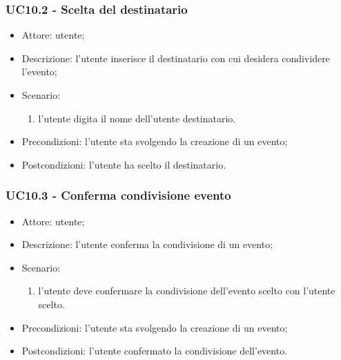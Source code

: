 \subsubsection{UC10.2 - Scelta del destinatario} \label{sec: UC10.2}
\begin{itemize}
    \item Attore: utente;
    \item Descrizione: l'utente inserisce il destinatario con cui desidera condividere l'evento;
    \item Scenario:
        \begin{enumerate}
        \item l'utente digita il nome dell'utente destinatario.
        \end{enumerate}
    
    \item Precondizioni: l'utente sta svolgendo la creazione di un evento;
    \item Postcondizioni: l'utente ha scelto il destinatario.
\end{itemize}


\subsubsection{UC10.3 - Conferma condivisione evento} \label{sec: UC10.3}
\begin{itemize}
    \item Attore: utente;
    \item Descrizione: l'utente conferma la condivisione di un evento;
    \item Scenario:
        \begin{enumerate}
        \item l'utente deve confermare la condivisione dell'evento scelto con l'utente scelto.
        \end{enumerate}
    
    \item Precondizioni: l'utente sta svolgendo la creazione di un evento;
    \item Postcondizioni: l'utente confermato la condivisione dell'evento.
\end{itemize}

